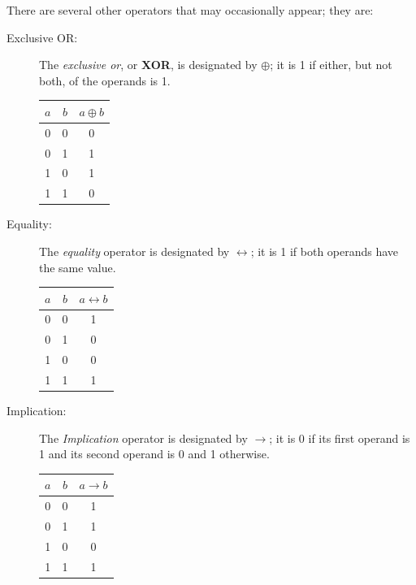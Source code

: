 \documentclass[letterpaper]{article}
\begin{document}
There are several other operators that may occasionally appear; they are: 
\begin{description}
    \item[Exclusive OR:] The \emph{exclusive or}, or \textbf{XOR}, is designated by $\oplus$; it is 1 if either, but not both, of the operands is 1. 
    \begin{center}
        \begin{tabular}{c c|c}
            $a$ & $b$ & $a \oplus b$ \\ 
            \hline 
            0 & 0 & 0 \\ 
            0 & 1 & 1 \\ 
            1 & 0 & 1 \\ 
            1 & 1 & 0
        \end{tabular}
    \end{center} 

    \item[Equality:] The \emph{equality} operator is designated by $\longleftrightarrow$; it is 1 if both operands have the same value. 
    \begin{center}
        \begin{tabular}{c c|c}
            $a$ & $b$ & $a \longleftrightarrow b$ \\ 
            \hline 
            0 & 0 & 1 \\ 
            0 & 1 & 0 \\ 
            1 & 0 & 0 \\ 
            1 & 1 & 1
        \end{tabular}
    \end{center} 
    
    \item[Implication:] The \emph{Implication} operator is designated by $\longrightarrow$; it is 0 if its first operand is 1 and its second operand is 0 and 1 otherwise. 
    \begin{center}
        \begin{tabular}{c c|c}
            $a$ & $b$ & $a \longrightarrow b$ \\ 
            \hline 
            0 & 0 & 1 \\ 
            0 & 1 & 1 \\ 
            1 & 0 & 0 \\ 
            1 & 1 & 1
        \end{tabular}
    \end{center} 
\end{description}
\end{document}
